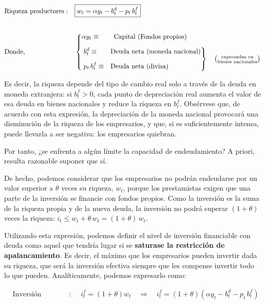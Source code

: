 \documentclass[10pt,a4paper]{article}
\begin{document}
$$\begin{aligned}
  &\text{Riqueza productores}:&&\boxed{w_t=\alpha y_t-b^d_t-p_t\,b^f_t}\\[2em]
    &\text{Donde,}&&
    \left\{\begin{aligned}
        &\alpha y_t\equiv\hspace{2em}\text{Capital (Fondos propios)}\\[0.5em]
        &\left.\begin{aligned}
            &b^d_t\equiv&&\text{Deuda neta (moneda nacional)}\\[0.5em]
            &p_t\,b_t^f\equiv&&\text{Deuda neta (divisa)}
        \end{aligned}\right\}\quad \left(\substack{\text{\scriptsize expresadas en}\\\text{\scriptsize bienes nacionales}}\right)
    \end{aligned}\right.
\end{aligned}$$

Es decir, la riqueza depende del tipo de cambio real solo a través de la deuda en moneda extranjera: si $b^f_t>0$, cada punto de depreciación real aumenta el valor de esa deuda en bienes nacionales y reduce la riqueza en $b^f_t$. Obsérvese que, de acuerdo con esta expresión, la depreciación de la moneda nacional provocará una disminución de la riqueza de los empresarios, y que, si es suficientemente intensa, puede llevarla a ser negativa: los empresarios quiebran.

Por tanto, ¿se enfrenta a algún límite la capacidad de endeudamiento? A priori, resulta razonable suponer que sí.

De hecho, podemos considerar que los empresarios no podrán endeudarse por un valor superior a $\theta$ veces su riqueza, $w_t$, porque los prestamistas exigen que una parte de la inversión se financie con fondos propios. Como la inversión es la suma de la riqueza propia y de la nueva deuda, la inversión no podrá superar $(1+\theta)$ veces la riqueza: $i_t\leq w_t+\theta\,w_t=(1+\theta)\,w_t$.

Utilizando esta expresión, podemos definir el nivel de inversión financiable con deuda como aquel que tendría lugar si se \textbf{saturase la restricción de apalancamiento}. Es decir, el máximo que los empresarios pueden invertir dada su riqueza, que será la inversión efectiva siempre que les compense invertir todo lo que pueden. Analíticamente, podemos expresarlo como:

$$\begin{aligned}
  &\text{Inversión financiable}:&&i_t^f=(1+\theta)w_t\quad\Longrightarrow\quad i_t^f=(1+\theta)(\alpha y_t-b_t^d-p_t\,b_t^f)
\end{aligned}$$
\end{document}
